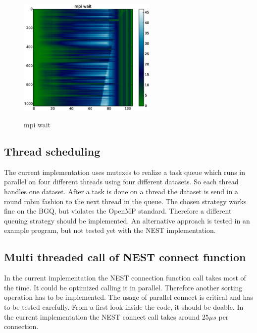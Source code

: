 \documentclass[a4paper]{article}
\begin{document}
\begin{figure}[ht!]
	\begin{center}
      	\label{fig:fourth}
    		\includegraphics[width=0.6\textwidth]{V03_mpiwait.eps}
    		\caption{mpi wait}
    \end{center}
\end{figure}     


\subsection{Thread scheduling}
The current implementation uses mutexes to realize a task queue which runs in parallel on four different threads using four different datasets. So each thread handles one dataset. After a task is done on a thread the dataset is send in a round robin fashion to the next thread in the queue. The chosen strategy works fine on the BGQ, but violates the OpenMP standard.
Therefore a different queuing strategy should be implemented. An alternative approach is tested in an example program,
but not tested yet with the NEST implementation.

\subsection{Multi threaded call of NEST connect function}
In the current implementation the NEST connection function call takes most of the time.
It could be optimized calling it in parallel. Therefore another sorting operation has to be implemented.
The usage of parallel connect is critical and has to be tested carefully.
From a first look inside the code, it should be doable.
In the current implementation the NEST connect call takes around $25 \mu s$ per connection. 
 


\newpage



\end{document}
